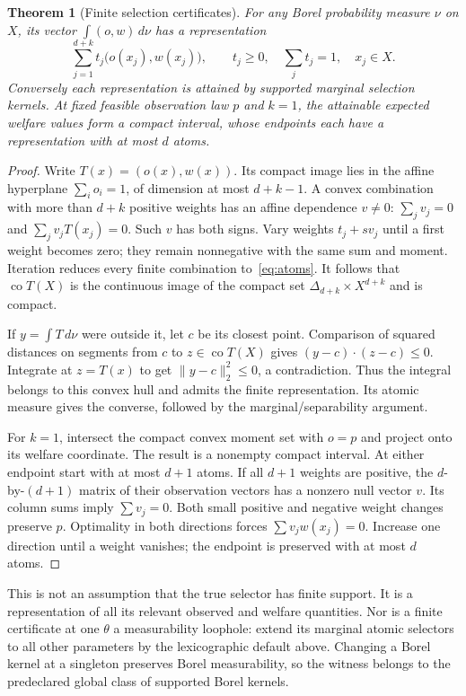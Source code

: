 \documentclass[11pt,a4paper]{article}
\numberwithin{equation}{section}
\newtheorem{theorem}{Theorem}[section]
\theoremstyle{definition}
\DeclareMathOperator{\co}{co}
\begin{document}
\begin{theorem}[Finite selection certificates]\label{thm:atoms}
For any Borel probability measure $\nu$ on $X$, its vector
$\int(o,w)\,d\nu$ has a representation
\begin{equation}\label{eq:atoms}
 \sum_{j=1}^{d+k} t_j\bigl(o(x_j),w(x_j)\bigr),\qquad
 t_j\ge0,\quad\sum_jt_j=1,\quad x_j\in X.
\end{equation}
Conversely each representation is attained by supported marginal
selection kernels. At fixed feasible observation law $p$ and $k=1$,
the attainable expected welfare values form a compact interval, whose
endpoints each have a representation with at most $d$ atoms.
\end{theorem}
\begin{proof}
Write $T(x)=(o(x),w(x))$. Its compact image lies in the affine hyperplane
$\sum_i o_i=1$, of dimension at most $d+k-1$. A convex combination with
more than $d+k$ positive weights has an affine dependence $v\ne0$:
$\sum_jv_j=0$ and $\sum_jv_jT(x_j)=0$. Such $v$ has both signs.
Vary weights $t_j+s v_j$ until a first weight becomes zero; they remain
nonnegative with the same sum and moment. Iteration reduces every finite
combination to~\eqref{eq:atoms}. It follows that $\co T(X)$ is the
continuous image of the compact set $\Delta_{d+k}\times X^{d+k}$ and
is compact.

If $y=\int T\,d\nu$ were outside it, let $c$ be its closest point.
Comparison of squared distances on segments from $c$ to $z\in\co T(X)$
gives $(y-c)\cdot(z-c)\le0$. Integrate at $z=T(x)$ to get
$\|y-c\|_2^2\le0$, a contradiction. Thus the integral belongs to this
convex hull and admits the finite representation. Its atomic measure
gives the converse, followed by the marginal/separability argument.

For $k=1$, intersect the compact convex moment set with $o=p$ and project
onto its welfare coordinate. The result is a nonempty compact interval.
At either endpoint start with at most $d+1$ atoms. If all $d+1$ weights
are positive, the $d$-by-$(d+1)$ matrix of their observation vectors has
a nonzero null vector $v$. Its column sums imply $\sum v_j=0$.
Both small positive and negative weight changes preserve $p$. Optimality
in both directions forces $\sum v_j w(x_j)=0$. Increase one direction
until a weight vanishes; the endpoint is preserved with at most $d$ atoms.
\end{proof}

This is not an assumption that the true selector has finite support.
It is a representation of all its relevant observed and welfare quantities.
Nor is a finite certificate at one $\theta$ a measurability loophole:
extend its marginal atomic selectors to all other parameters by the
lexicographic default above. Changing a Borel kernel at a singleton
preserves Borel measurability, so the witness belongs to the predeclared
global class of supported Borel kernels.
\end{document}
